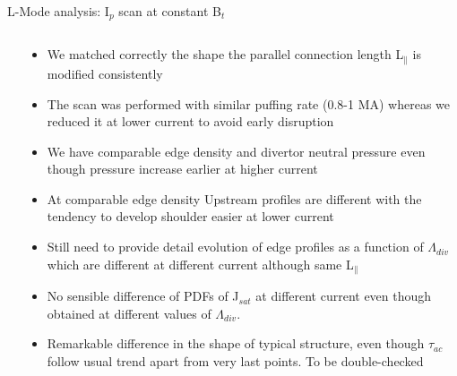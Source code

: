 \documentclass[10pt, compress]{beamer}
\newcommand\Fontvi{\fontsize{8}{7.2}\selectfont}
\begin{document}
\begin{frame}{L-Mode analysis: I$_p$ scan at constant B$_t$}
\Fontvi
  \vspace{-1cm}
\begin{columns}
  \begin{column}{0.65\textwidth}
  \end{column}
  \begin{column}{0.35\textwidth}
    \begin{itemize}
      \item<1|only@1> We matched correctly the shape the parallel
        connection length L$_{\parallel}$ is modified consistently
      \item<2|only@2> The scan was performed with similar puffing rate (0.8-1
        MA) whereas we reduced it at lower current to avoid early disruption
      \item<2|only@2> We have comparable edge density and divertor neutral
        pressure even though pressure increase earlier at higher current
      \item<3|only@3> At comparable edge density Upstream profiles are
        different with the tendency to develop shoulder easier at
        lower current
      \item<3|only@3> Still need to provide detail evolution of edge
        profiles as a function
        of $\Lambda_{div}$ which are different at different current
        although same L$_{\parallel}$
      \item<4|only@4> No sensible difference of PDFs of J$_{sat}$ at
        different current even though obtained at different values of $\Lambda_{div}$. 
      \item<4|only@4> Remarkable difference in the shape of typical
        structure,  even though $\tau_{ac}$ follow usual trend apart
        from very last points. \alert{To be double-checked}
      \end{itemize}
    \end{column}
\end{columns}
\end{frame}
\end{document}
